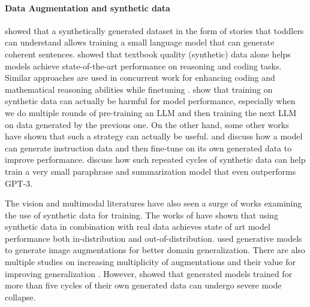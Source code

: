 \documentclass[table]{article}
\begin{document}
\paragraph{Data Augmentation and synthetic data}
\citet{eldan2023tinystories} showed that a synthetically generated dataset in the form of stories that toddlers can understand
allows training a small language model that can generate coherent sentences.
\citet{gunasekar2023textbooks} showed that textbook quality (synthetic) data alone helps models achieve state-of-the-art performance on reasoning and coding tasks. Similar approaches are used in concurrent work for enhancing coding and mathematical reasoning abilities while finetuning \cite{liu2023tinygsm,wei2023magicoder}.
\citet{shumailov2023model} show that training on synthetic data can actually be harmful for model performance, especially when
we do multiple rounds of pre-training an LLM and then training the next LLM on data generated by the previous one.
On the other hand, some other works have shown that such a strategy can actually be useful.
\citet{li2023self} and \citet{koksal2023longform} discuss how a model can generate instruction data and then fine-tune on its own generated data
to improve performance.
\citet{jung2023impossible} discuss how such repeated cycles of synthetic data can help train a very small paraphrase and summarization model that even outperforms GPT-3.

The vision and multimodal literatures have also seen a surge of works examining the use of synthetic data for training.
The works of \citet{bansal2023leaving,trabucco2023effective,azizi2023synthetic} have shown that using synthetic data in 
combination with real data achieves state of art model performance both in-distribution and out-of-distribution. \citet{cubuk2020randaugment} used generative models to generate image augmentations for better domain generalization. There are also multiple studies on increasing multiplicity of augmentations and their value for improving generalization \citep{choi2019faster,fort2021drawing,hoffer2020augment}.  
However, \citet{alemohammad2023self} showed that generated models trained for more than five cycles of their own generated data can undergo severe mode collapse.
\end{document}
